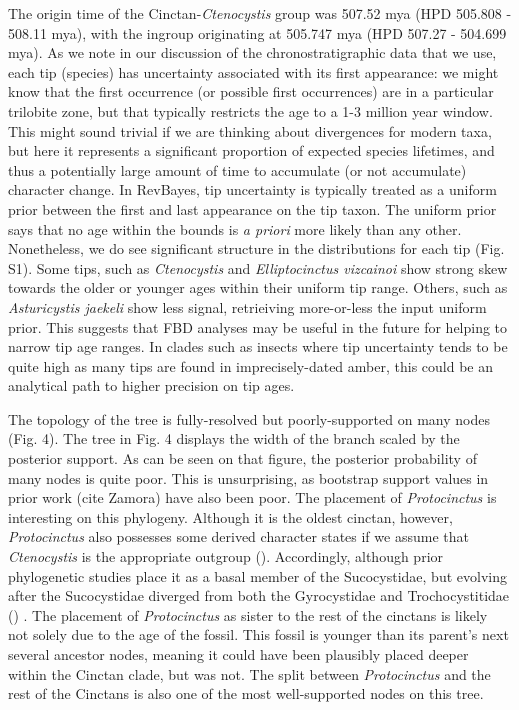 \documentclass{article}
\begin{document}
The origin time of the Cinctan-\textit{Ctenocystis} group was 507.52 mya (HPD 505.808 - 508.11 mya), with the ingroup originating at 505.747 mya (HPD 507.27 - 504.699 mya).
As we note in our discussion of the chronostratigraphic data that we use, each tip (species) has uncertainty associated with its first appearance: we might know that the first occurrence (or possible first occurrences) are in a particular trilobite zone, but that typically restricts the age to a 1-3 million year window.  This might sound trivial if we are thinking about divergences for modern taxa, but here it represents a significant proportion of expected species lifetimes, and thus a potentially large amount of time to accumulate (or not accumulate) character change.
In RevBayes, tip uncertainty is typically treated as a uniform prior between the first and last appearance on the tip taxon.
The uniform prior says that no age within the bounds is \textit{a priori} more likely than any other.
Nonetheless, we do see significant structure in the distributions for each tip (Fig. S1). 
Some tips, such as \textit{Ctenocystis} and \textit{Elliptocinctus vizcainoi} show strong skew towards the older or younger ages within their uniform tip range.
Others, such as \textit{Asturicystis jaekeli} show less signal, retrieiving more-or-less the input uniform prior.
This suggests that FBD analyses may be useful in the future for helping to narrow tip age ranges.
In clades such as insects where tip uncertainty tends to be quite high as many tips are found in imprecisely-dated amber, this could be an analytical path to higher precision on tip ages.

The topology of the tree is fully-resolved but poorly-supported on many nodes (Fig. 4).
The tree in Fig. 4 displays the width of the branch scaled by the posterior support.
As can be seen on that figure, the posterior probability of many nodes is quite poor. 
This is unsurprising, as bootstrap support values in prior work (cite Zamora) have also been poor.
The placement of \textit{Protocinctus} is interesting on this phylogeny. 
Although it is the oldest cinctan, however, \textit{Protocinctus} also possesses some derived character states if we assume that \textit{Ctenocystis} is the appropriate outgroup (\cite{Rahman2009a}).  Accordingly, although prior phylogenetic studies place it as a basal member of the Sucocystidae, but evolving after the Sucocystidae diverged from both the Gyrocystidae and Trochocystitidae (\cite{Smith2009, Zamora2013}) . 
The placement of \textit{Protocinctus} as sister to the rest of the cinctans is likely not solely due to the age of the fossil. This fossil is younger than its parent's next several ancestor nodes, meaning it could have been plausibly placed deeper within the Cinctan clade, but was not. 
The split between \textit{Protocinctus} and the rest of the Cinctans is also one of the most well-supported nodes on this tree.
\end{document}
